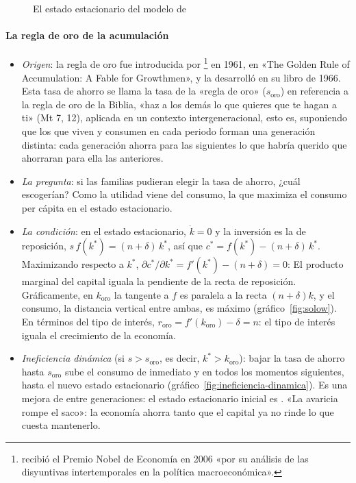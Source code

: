 \documentclass[11pt]{article}
\begin{document}
\begin{figure}[H]
\centering
\caption{El estado estacionario del modelo de }\label{fig:solow-paso2}
\end{figure}

\paragraph{La regla de oro de la acumulación}

\begin{itemize}
\item \emph{Origen}: la regla de oro fue introducida por \footnote{ recibió el Premio Nobel de Economía en 2006 «por su análisis de las disyuntivas intertemporales en la política macroeconómica»\nocite{Nobel2006Phelps}.} en 1961, en «The Golden Rule of Accumulation: A Fable for Growthmen»\nocite{Phelps1961}, y la desarrolló en su libro de 1966\nocite{Phelps1966}. Esta tasa de ahorro se llama la tasa de la «regla de oro» ($s_{\mathrm{oro}}$) en referencia a la regla de oro de la Biblia, «haz a los demás lo que quieres que te hagan a ti» (Mt 7, 12), aplicada en un contexto intergeneracional, esto es, suponiendo que los que viven y consumen en cada periodo forman una generación distinta: cada generación ahorra para las siguientes lo que habría querido que ahorraran para ella las anteriores.
\item \emph{La pregunta}: si las familias pudieran elegir la tasa de ahorro, ¿cuál escogerían? Como la utilidad viene del consumo, la que maximiza el consumo per cápita en el estado estacionario.
\item \emph{La condición}: en el estado estacionario, $\dot k=0$ y la inversión es la de reposición, $s\,f(k^*)=(n+\delta)\,k^*$, así que $c^*=f(k^*)-(n+\delta)\,k^*$. Maximizando respecto a $k^*$, $\partial c^*/\partial k^*=f'(k^*)-(n+\delta)=0$:
  El producto marginal del capital iguala la pendiente de la recta de reposición. Gráficamente, en $k_{\mathrm{oro}}$ la tangente a $f$ es paralela a la recta $(n+\delta)k$, y el consumo, la distancia vertical entre ambas, es máximo (gráfico~\ref{fig:solow}). En términos del tipo de interés, $r_{\mathrm{oro}}=f'(k_{\mathrm{oro}})-\delta=n$: el tipo de interés iguala el crecimiento de la economía.
\item \emph{Ineficiencia dinámica} (si $s>s_{\mathrm{oro}}$, es decir, $k^*>k_{\mathrm{oro}}$): bajar la tasa de ahorro hasta $s_{\mathrm{oro}}$ sube el consumo de inmediato y en todos los momentos siguientes, hasta el nuevo estado estacionario (gráfico~\ref{fig:ineficiencia-dinamica}). Es una mejora de  entre generaciones: el estado estacionario inicial es . «La avaricia rompe el saco»: la economía ahorra tanto que el capital ya no rinde lo que cuesta mantenerlo.

\end{itemize}
\end{document}
